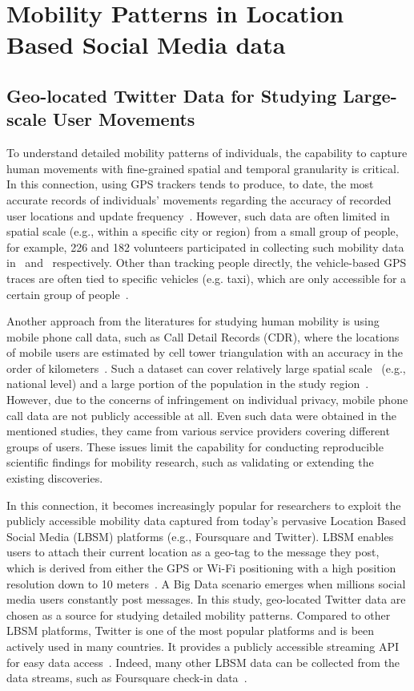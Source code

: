 \documentclass[ijgi,article,accept,moreauthors,pdftex,10pt,a4paper]{mdpi}
\theoremstyle{mdpi}
\newcounter{ex}
\newcounter{re}
\theoremstyle{mdpidefinition}
\begin{document}
\section{Mobility Patterns in Location Based Social Media data}
\subsection{Geo-located Twitter Data for Studying Large-scale User Movements}
To understand detailed mobility patterns of individuals, the capability to capture human movements with fine-grained spatial and temporal granularity is critical.
In this connection, using GPS trackers tends to produce, to date, the most accurate records of individuals' movements regarding the accuracy of recorded user locations and update frequency~\cite{zheng2008understanding}.
However, such data are often limited in spatial scale (e.g., within a specific city or region) from a small group of people, for example, 226 and 182 volunteers participated in collecting such mobility data in~\cite{rhee2011levy} and~\cite{zheng2010geolife} respectively.
Other than tracking people directly, the vehicle-based GPS traces are often tied to specific vehicles (e.g. taxi), which are only accessible for a certain group of people~\cite{kung2014exploring}. 

Another approach from the literatures for studying human mobility is using mobile phone call data, such as Call Detail Records (CDR), where the locations of mobile users are estimated by cell tower triangulation with an accuracy in the order of kilometers~\cite{gonzalez2008understanding,sevtsuk2010does,kung2014exploring}.
Such a dataset can cover relatively large spatial scale~\cite{becker2013human,sobolevsky2013delineating} (e.g., national level) and a large portion of the population in the study region~\cite{kung2014exploring}.
However, due to the concerns of infringement on individual privacy, mobile phone call data are not publicly accessible at all.
Even such data were obtained in the mentioned studies, they came from various service providers covering different groups of users.
These issues limit the capability for conducting reproducible scientific findings for mobility research, such as validating or extending the existing discoveries.

In this connection, it becomes increasingly popular for researchers to exploit the publicly accessible mobility data captured from today's pervasive Location Based Social Media (LBSM) platforms (e.g., Foursquare and Twitter).
LBSM enables users to attach their current location as a geo-tag to the message they post, which is derived from either the GPS or Wi-Fi positioning with a high position resolution down to 10 meters~\cite{Jurdak2015}.
A Big Data scenario emerges when millions social media users constantly post messages.
In this study, geo-located Twitter data are chosen as a source for studying detailed mobility patterns.
Compared to other LBSM platforms, Twitter is one of the most popular platforms and is been actively used in many countries.
It provides a publicly accessible streaming API for easy data access~\cite{twitterAPI}.
Indeed, many other LBSM data can be collected from the data streams, such as Foursquare check-in data~\cite{cranshaw2012livehoods,hasan2013understanding}.
\end{document}
